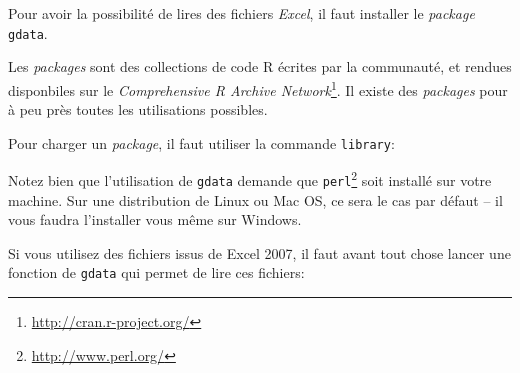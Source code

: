 Pour avoir la possibilité de lires des fichiers \emph{Excel}, il faut installer le \emph{package} \texttt{gdata}.

\begin{knitrout}
\color{fgcolor}\begin{kframe}
\begin{flushleft}
\ttfamily\noindent
{}\hlkeyword{(}\hlkeyword{)}\mbox{}
\normalfont
\end{flushleft}
\end{kframe}
\end{knitrout}


\noindent Les \emph{packages} sont des collections de code R écrites par la communauté, et rendues disponbiles sur le \emph{Comprehensive R Archive Network}\footnote{\url{http://cran.r-project.org/}}.
Il existe des \emph{packages} pour à peu près toutes les utilisations possibles.

Pour charger un \emph{package}, il faut utiliser la commande \texttt{library}:

\begin{knitrout}
\color{fgcolor}\begin{kframe}
\begin{flushleft}
\ttfamily\noindent
{}\hlkeyword{(}\hlkeyword{)}\mbox{}
\normalfont
\end{flushleft}
\end{kframe}
\end{knitrout}


Notez bien que l'utilisation de \texttt{gdata} demande que \texttt{perl}\footnote{\url{http://www.perl.org/}} soit installé sur votre machine.
Sur une distribution de Linux ou Mac OS, ce sera le cas par défaut -- il vous faudra l'installer vous même sur Windows.

Si vous utilisez des fichiers issus de Excel 2007, il faut avant tout chose lancer une fonction de \texttt{gdata} qui permet de lire ces fichiers:

\begin{knitrout}
\color{fgcolor}\begin{kframe}
\begin{flushleft}
\ttfamily\noindent
{}\hlkeyword{(}\hlargument{=}{\ }\hlkeyword{,}{\ }\hlargument{=}{\ }\hlkeyword{)}\mbox{}
\normalfont
\end{flushleft}
\end{kframe}
\end{knitrout}


